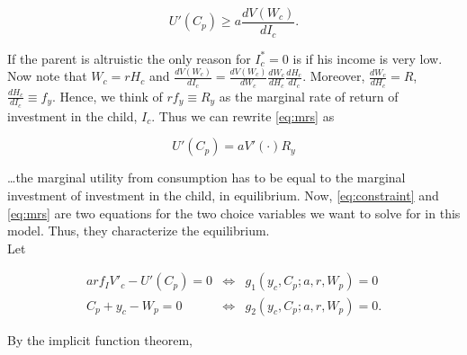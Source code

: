 \begin{equation}
U'(C_{p}) \geq a \frac{d V(W_{c})}{d I_{c}}. \label{eq:mrs}
\end{equation}

\noindent If the parent is altruistic the only reason for $I_{c}^* = 0$ is if his income is very low. Now note that $W_{c} = r H_{c}$ and $\frac{d V(W_{c})}{d I_{c}} = \frac{d V(W_{c})}{d W_{c}} \frac{d W_{c}}{d H_{c}} \frac{d H_{c}}{d I_{c}}$. Moreover, $\frac{d W_{c}}{d H_{c}} = R$, $\frac{d H_{c}}{d I_{c}} \equiv f_{y}$. Hence, we think of $r f_{y} \equiv R_{y}$ as the marginal rate of return of investment in the child, $I_{c}$. Thus we can rewrite \eqref{eq:mrs} as

\begin{equation}
U'(C_{p}) = a V'(\cdot) R_{y}
\end{equation}

\noindent \ldots the marginal utility from consumption has to be equal to the marginal investment of investment in the child, in equilibrium. Now, \eqref{eq:constraint} and \eqref{eq:mrs} are two equations for the two choice variables we want to solve for in this model. Thus, they characterize the equilibrium.\\
\indent Let

\begin{eqnarray}
a r f_I V'_{c} - U'(C_p) = 0 &\Leftrightarrow& g_1 (y_c, C_p; a, r, W_p) = 0 \label{eq:g1} \\
C_p + y_c - W_p = 0 &\Leftrightarrow& g_2 (y_c, C_p; a, r, W_p) = 0.  \label{eq:g2} 
\end{eqnarray}

\noindent By the implicit function theorem,


